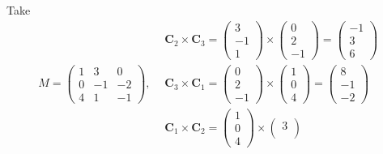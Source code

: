 \documentclass[a4paper]{article}
\begin{document}
    \begin{example}
      Take
      \[
        M=
        \begin{pmatrix}
          1&3&0\\
          0&-1&-2\\
          4&1&-1
        \end{pmatrix},
        \begin{aligned}
          &\mathbf{C}_{2} \times \mathbf{C}_{3}=
          \begin{pmatrix}
            3 \\
            -1 \\
            1
          \end{pmatrix} \times
          \begin{pmatrix}
            0 \\
            2 \\
            -1
          \end{pmatrix}=
          \begin{pmatrix}
            -1 \\
            3 \\
            6
          \end{pmatrix}\\
          &\mathbf{C}_{3} \times \mathbf{C}_{1}=
          \begin{pmatrix}
            0 \\
            2 \\
            -1
          \end{pmatrix} \times
          \begin{pmatrix}
            1 \\
            0 \\
            4
          \end{pmatrix}=
          \begin{pmatrix}
            8 \\
            -1 \\
            -2
          \end{pmatrix}\\
          &\mathbf{C}_{1} \times \mathbf{C}_{2}=
          \begin{pmatrix}
            1 \\
            0 \\
            4
          \end{pmatrix} \times
          \begin{pmatrix}
            3 \\

\end{pmatrix}
\end{aligned}\]
\end{example}
\end{document}
